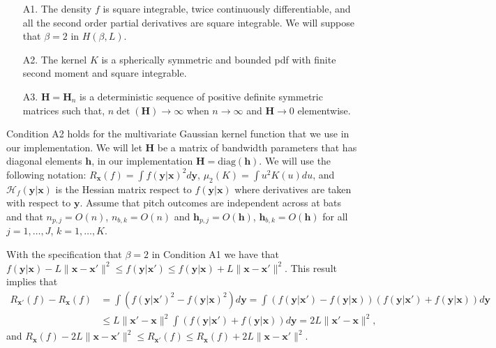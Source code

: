 \documentclass[11pt]{article}
\newcommand{\Hcal}{\mathcal{H}}
\newcommand{\Hbf}{\textbf{H}}
\newcommand{\y}{\textbf{y}}
\newcommand{\x}{\textbf{x}}
\newcommand{\h}{\textbf{h}}
\begin{document}
\begin{itemize}
\item[A1.] The density $f$ is square integrable, twice continuously differentiable, and all the second order partial derivatives are square integrable. We will suppose that $\beta = 2$ in $H(\beta,L)$.
\item[A2.] The kernel $K$ is a spherically symmetric and bounded pdf with finite second moment and square integrable.
\item[A3.] $\Hbf = \Hbf_n$ is a deterministic sequence of positive definite symmetric matrices such that, $n\det(\Hbf) \to \infty$ when $n \to \infty$ and $\Hbf \to 0$ elementwise. 
\end{itemize}

Condition A2 holds for the multivariate Gaussian kernel function that we use in our implementation.
We will let $\Hbf$ be a matrix of bandwidth parameters that has diagonal elements $\h$, in our implementation $\Hbf = \text{diag}(\h)$. We will use the following notation: $R_{\x}(f) = \int f(\y|\x)^2 d\y$, $\mu_2(K) = \int u^2K(u)du$, and $\Hcal_f(\y|\x)$ is the Hessian matrix respect to $f(\y|\x)$ where derivatives are taken with respect to $\y$. Assume that pitch outcomes are independent across at bats and that $n_{p,j} = O(n)$, $n_{b,k} = O(n)$ and $\h_{p,j} = O(\h)$, $\h_{b,k} = O(\h)$ for all $j = 1, \ldots, J$, $k = 1, \ldots, K$. 

With the specification that $\beta = 2$ in Condition A1 we have that 
$
   f(\y|\x) - L\|\x-\x'\|^2 \leq f(\y|\x') \leq f(\y|\x) + L\|\x-\x'\|^2.
$
This result implies that
\begin{align*}
  R_{\x'}(f) - R_\x(f) &= \int (f(\y|\x')^2 - f(\y|\x)^2) d\y 
     = \int (f(\y|\x') - f(\y|\x))(f(\y|\x') + f(\y|\x)) d\y \\
  &\leq L\|\x'-\x\|^2 \int(f(\y|\x') + f(\y|\x)) d\y 
    = 2L\|\x'-\x\|^2,
\end{align*}
and 
$
   R_\x(f) - 2L\|\x-\x'\|^2 \leq R_{\x'}(f) \leq R_\x(f) + 2L\|\x-\x'\|^2.
$ 
\end{document}
